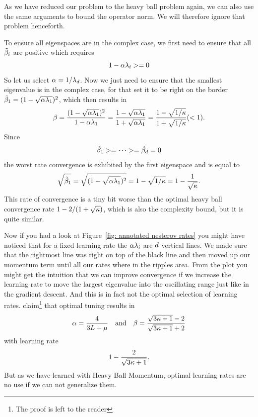 As we have reduced our problem to the heavy ball problem again, we can also use
the same arguments to bound the operator norm. We will therefore ignore that
problem henceforth.

To ensure all eigenspaces are in the complex case, we first need to ensure that
all \(\tilde{\beta}_i\) are positive which requires
\begin{align*}
	1-\alpha\lambda_i >= 0
\end{align*}
So let us select \(\alpha= 1/\lambda_d\). Now we just need to ensure
that the smallest eigenvalue is in the complex case, for that set it to be
right on the border \(\tilde{\beta}_1=(1-\sqrt{\alpha\lambda_1})^2\),
which then results in
\begin{align*}
	\beta = \frac{(1-\sqrt{\alpha\lambda_1})^2}{1-\alpha\lambda_1}
	=\frac{1-\sqrt{\alpha\lambda_1}}{1+\sqrt{\alpha\lambda_1}}
	=\frac{1-\sqrt{1/\kappa}}{1+\sqrt{1/\kappa}} (< 1).
\end{align*}
Since
\begin{align*}
	\tilde{\beta}_1 >= \dots >=\tilde{\beta}_d=0
\end{align*}
the worst rate convergence is exhibited by the first eigenspace and is equal to
\begin{align}\label{eq: nesterov convegence rate eigenvalue derivation}
	\sqrt{\tilde{\beta}_1} = \sqrt{(1-\sqrt{\alpha\lambda_1})^2}
	= 1-\sqrt{1/\kappa} = 1- \frac{1}{\sqrt{\kappa}}.
\end{align}
%
This rate of convergence is a tiny bit worse than the optimal heavy ball
convergence rate \(1-2/(1+\sqrt{\kappa})\), which is also the complexity
bound, but it is quite similar.

Now if you had a look at Figure~\ref{fig:
annotated nesterov rates} you might have noticed that for a fixed learning
rate the \(\alpha\lambda_i\) are \(d\) vertical lines. We made sure
that the rightmost line was right on top of the black line and then moved up
our momentum term until all our rates where in the ripples area. From the
plot you might get the intuition that we can improve convergence if we
increase the learning rate to move the largest eigenvalue into the oscillating
range just like in the gradient descent. And this is in fact not the optimal
selection of learning rates. \textcite{lessardAnalysisDesignOptimization2016}
claim\footnote{The proof is left to the reader} that optimal tuning results in
\begin{align*}
	\alpha = \frac{4}{3L + \mu}
	\quad \text{and} \quad
	\beta = \frac{\sqrt{3\kappa+1}-2}{\sqrt{3\kappa+1}+2}
\end{align*}
with learning rate
\begin{align*}
	1-\frac{2}{\sqrt{3\kappa+1}}.
\end{align*}
But as we have learned with
Heavy Ball Momentum, optimal learning rates are no use if we can not generalize
them.


